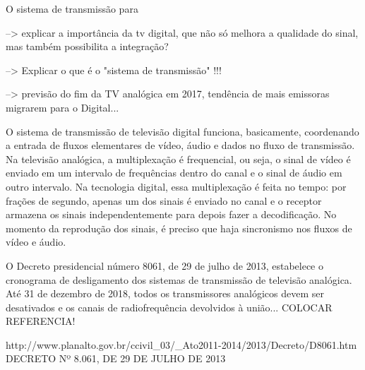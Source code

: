 \documentclass[
	12pt,				%
	openright,			%
	twoside,			%
	a4paper,			%
	english,			%
	french,				%
	brazil				%
	]{abntex2}
\begin{document}
O sistema de transmissão para 

--> explicar a importância da tv digital, que não só melhora a qualidade do sinal, mas também possibilita 
a integração?

 --> Explicar o que é o "sistema de transmissão" !!!
 
 --> previsão do fim da TV analógica em 2017, tendência de mais emissoras migrarem para o Digital...
 
O sistema de transmissão de televisão digital funciona, basicamente, coordenando a entrada de fluxos elementares de
vídeo, áudio e dados no fluxo de transmissão. Na televisão analógica, a multiplexação é frequencial, ou seja, o sinal
de vídeo é enviado em um intervalo de frequências dentro do canal e o sinal de áudio em outro intervalo. Na tecnologia
digital, essa multiplexação é feita no tempo: por frações de segundo, apenas um dos sinais é enviado no canal e o
receptor armazena os sinais independentemente para depois fazer a decodificação. No momento da reprodução dos
sinais, é preciso que haja sincronismo nos fluxos de vídeo e áudio.

O Decreto presidencial número 8061, de 29 de julho de 2013, estabelece o cronograma de desligamento dos sistemas
de transmissão de televisão analógica. Até 31 de dezembro de 2018, todos os transmissores analógicos devem ser desativados
e os canais de radiofrequência devolvidos à união... COLOCAR REFERENCIA! 

http://www.planalto.gov.br/ccivil_03/_Ato2011-2014/2013/Decreto/D8061.htm
DECRETO Nº 8.061, DE 29 DE JULHO DE 2013

\end{document}
